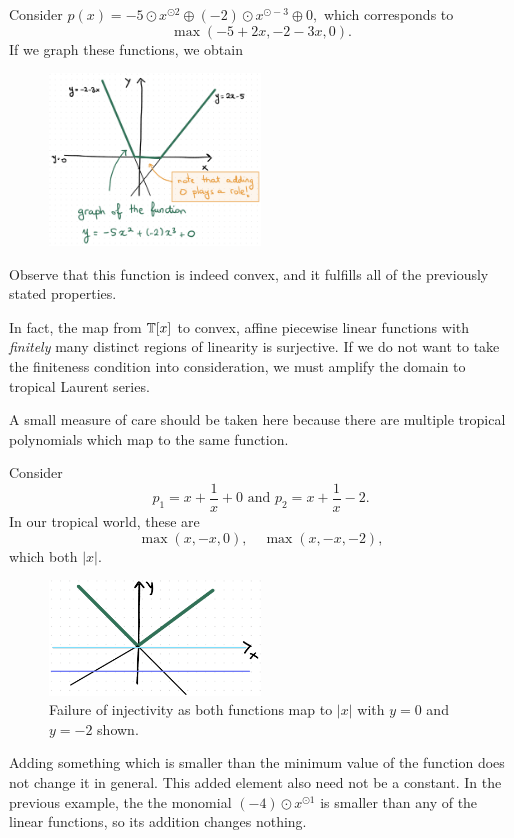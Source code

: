 \documentclass[12pt]{memoir}
\theoremstyle{definition}
\begin{document}
\begin{Ex}
    Consider $p(x)=-5\odot x^{\odot2}\oplus(-2)\odot x^{\odot-3}\oplus 0,$ which corresponds to 
    $$\max(-5+2x,-2-3x,0).$$
    If we graph these functions, we obtain
    \begin{figure}[h!]
        \centering
        \includegraphics[width=0.5\textwidth]{figs/fig3-1RenzoNotes3.png}
        \label{fig:3.1-ConvPLFunc}
    \end{figure}

    Observe that this function is indeed convex, and it fulfills all of the previously stated properties. 
\end{Ex}

In fact, the map from $\mathbb{T}[x]$ to convex, affine piecewise linear functions with \emph{finitely} many distinct regions of linearity is surjective. If we do not want to take the finiteness condition into consideration, we must amplify the domain to tropical Laurent series.\par 
A small measure of care should be taken here because there are multiple tropical polynomials which map to the same function.

\begin{Ex}
    Consider 
    $$p_1=x+\frac{1}{x}+0\text{ and }p_2=x+\frac1x-2.$$
    In our tropical world, these are
    $$\max(x,-x,0),\quad\max(x,-x,-2),$$
    which both $|x|.$
    \begin{figure}[h!]
        \centering
        \includegraphics[width=0.5\textwidth]{figs/fig3-2RenzoNotes3.png}
        \caption{Failure of injectivity as both functions map to $|x|$ with $y=0$ and $y=-2$ shown.}
        \label{fig:3.2-InjectivityFailure}
    \end{figure}
    Adding something which is smaller than the minimum value of the function does not change it in general. This added element also need not be a constant. In the previous example, the the monomial $(-4)\odot x^{\odot 1}$ is smaller than any of the linear functions, so its addition changes nothing.
\end{Ex}
\end{document}
